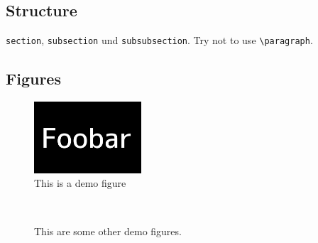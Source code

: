 \documentclass[a4paper,fontsize=12pt,toc=bib]{scrartcl}
\begin{document}

\subsection{Structure}

\texttt{section}, \texttt{subsection} und \texttt{subsubsection}. Try not to use \verb|\paragraph|.

\subsection{Figures}

\begin{figure}[h]
    \centering
    \includegraphics[width=4cm]{foobar} %
    \caption{This is a demo figure}
    \label{fig:demo1}
\end{figure}

\begin{figure}[h]
    \centering
    \hspace{0.2cm}
    \\
    \hspace{0.2cm}
    \caption{This are some other demo figures.}
    \label{fig:demo2-5}
\end{figure}
\end{document}

